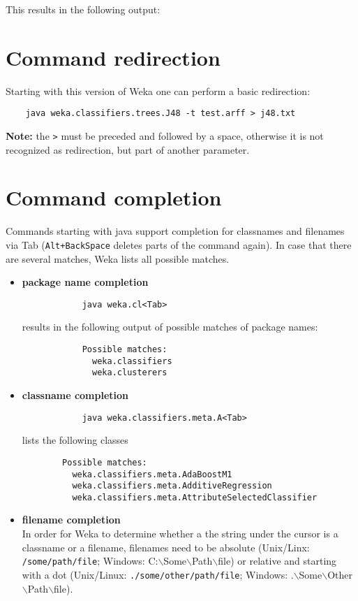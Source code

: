 This results in the following output: 
\begin{center}
\end{center}


\section{Command redirection}
Starting with this version of Weka one can perform a basic redirection:

\begin{verbatim}
	java weka.classifiers.trees.J48 -t test.arff > j48.txt
\end{verbatim}

\noindent \textbf{Note:} the \texttt{>} must be preceded and followed by a space, otherwise it is not recognized as redirection, but part of another parameter.

\section{Command completion}
Commands starting with java support completion for classnames and filenames via Tab (\texttt{Alt+BackSpace} deletes parts of the command again). In case that there are several matches, Weka lists all possible matches.

\begin{itemize}
	\item \textbf{package name completion}
		\begin{verbatim}
			java weka.cl<Tab>
		\end{verbatim}
		results in the following output of possible matches of package names:
		\begin{verbatim}
			Possible matches:
			  weka.classifiers
			  weka.clusterers
		\end{verbatim}
	\item \textbf{classname completion}
		\begin{verbatim}
			java weka.classifiers.meta.A<Tab>
		\end{verbatim}
		lists the following classes
		\begin{verbatim}
		Possible matches:
		  weka.classifiers.meta.AdaBoostM1
		  weka.classifiers.meta.AdditiveRegression
		  weka.classifiers.meta.AttributeSelectedClassifier
		\end{verbatim}
	\item \textbf{filename completion} \\
	      In order for Weka to determine whether a the string under the cursor is a classname or a filename, filenames need to be absolute (Unix/Linx: \texttt{/some/path/file}; Windows: C:$\backslash$Some$\backslash$Path$\backslash$file) or relative and starting with a dot (Unix/Linux: \texttt{./some/other/path/file}; Windows: .$\backslash$Some$\backslash$Other$\backslash$Path$\backslash$file).
\end{itemize}

